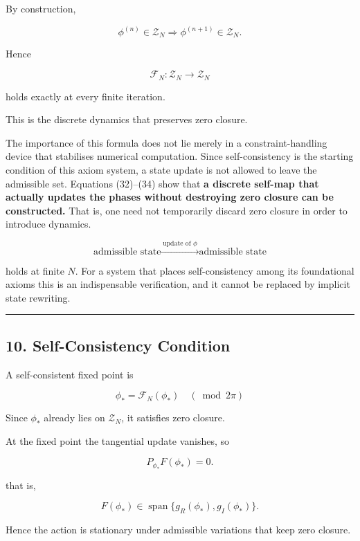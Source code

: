 \documentclass[
  a4paper,
]{article}
\begin{document}
By construction,

\[
\boxed{
\phi^{(n)}\in\mathcal Z_N
\Longrightarrow
\phi^{(n+1)}\in\mathcal Z_N.
}
\tag{33}
\]

Hence

\[
\boxed{
\mathcal F_N:
\mathcal Z_N
\to
\mathcal Z_N
}
\tag{34}
\]

holds exactly at every finite iteration.

This is the discrete dynamics that preserves zero closure.

The importance of this formula does not lie merely in a
constraint-handling device that stabilises numerical computation. Since
self-consistency is the starting condition of this axiom system, a state
update is not allowed to leave the admissible set. Equations (32)--(34)
show that \textbf{a discrete self-map that actually updates the phases
without destroying zero closure can be constructed.} That is, one need
not temporarily discard zero closure in order to introduce dynamics.

\[
\boxed{
\text{admissible state}
\xrightarrow{\;\text{update of }\phi\;}
\text{admissible state}
}
\]

holds at finite \(N\). For a system that places self-consistency among
its foundational axioms this is an indispensable verification, and it
cannot be replaced by implicit state rewriting.

\begin{center}\rule{0.5\linewidth}{0.5pt}\end{center}

\subsection{10. Self-Consistency
Condition}\label{self-consistency-condition}

A self-consistent fixed point is

\[
\boxed{
\phi_*
=
\mathcal F_N(\phi_*)
\quad
(\bmod 2\pi)
}
\tag{35}
\]

Since \(\phi_*\) already lies on \(\mathcal Z_N\), it satisfies zero
closure.

At the fixed point the tangential update vanishes, so

\[
\boxed{
P_{\phi_*}F(\phi_*)=0.
}
\tag{36}
\]

that is,

\[
F(\phi_*)
\in
\operatorname{span}
\{g_R(\phi_*),g_I(\phi_*)\}.
\tag{37}
\]

Hence the action is stationary under admissible variations that keep
zero closure.
\end{document}
